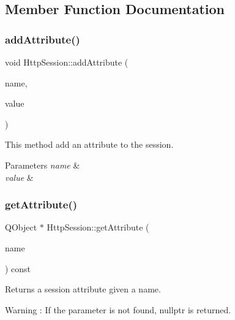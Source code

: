 \subsection{Member Function Documentation}
\mbox{\label{class_http_session_a9d7250801e2b43f61b28facf2b48c1b5}} 
\subsubsection{\texorpdfstring{add\+Attribute()}{addAttribute()}}
{\footnotesize\ttfamily void Http\+Session\+::add\+Attribute (\begin{DoxyParamCaption}\item[{const Q\+String \&}]{name,  }\item[{Q\+Object $\ast$}]{value }\end{DoxyParamCaption})}



This method add an attribute to the session. 


\begin{DoxyParams}{Parameters}
{\em name} & \\
\hline
{\em value} & \\
\hline
\end{DoxyParams}
\mbox{\label{class_http_session_acef8380ce20f3adb9d2bb9aad0ff3f46}} 
\subsubsection{\texorpdfstring{get\+Attribute()}{getAttribute()}}
{\footnotesize\ttfamily Q\+Object $\ast$ Http\+Session\+::get\+Attribute (\begin{DoxyParamCaption}\item[{const Q\+String \&}]{name }\end{DoxyParamCaption}) const}



Returns a session attribute given a name. 

\begin{DoxyWarning}{Warning}
\+: If the parameter is not found, nullptr is returned. 
\end{DoxyWarning}
\mbox{\label{class_http_session_a0bb33f4c387b07264245de390984be10}} 
